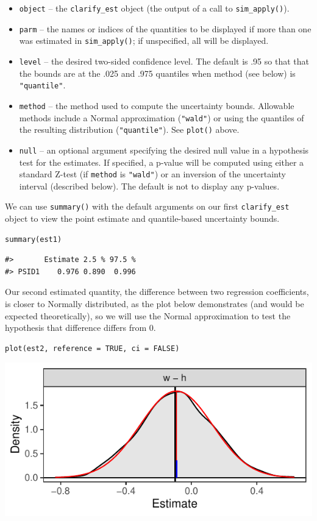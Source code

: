 \begin{itemize}
\item
  \texttt{object} -- the \texttt{clarify\_est} object (the output of a call to \texttt{sim\_apply()}).
\item
  \texttt{parm} -- the names or indices of the quantities to be displayed if more than one was estimated in \texttt{sim\_apply()}; if unspecified, all will be displayed.
\item
  \texttt{level} -- the desired two-sided confidence level. The default is .95 so that that the bounds are at the .025 and .975 quantiles when method (see below) is \texttt{"quantile"}.
\item
  \texttt{method} -- the method used to compute the uncertainty bounds. Allowable methods include a Normal approximation (\texttt{"wald"}) or using the quantiles of the resulting distribution (\texttt{"quantile"}). See \texttt{plot()} above.
\item
  \texttt{null} -- an optional argument specifying the desired null value in a hypothesis test for the estimates. If specified, a p-value will be computed using either a standard Z-test (if \texttt{method} is \texttt{"wald"}) or an inversion of the uncertainty interval (described below). The default is not to display any p-values.
\end{itemize}

We can use \texttt{summary()} with the default arguments on our first \texttt{clarify\_est} object to view the point estimate and quantile-based uncertainty bounds.

\begin{verbatim}
summary(est1)
\end{verbatim}

\begin{verbatim}
#>       Estimate 2.5 % 97.5 %
#> PSID1    0.976 0.890  0.996
\end{verbatim}

Our second estimated quantity, the difference between two regression coefficients, is closer to Normally distributed, as the plot below demonstrates (and would be expected theoretically), so we will use the Normal approximation to test the hypothesis that difference differs from 0.

\begin{verbatim}
plot(est2, reference = TRUE, ci = FALSE)
\end{verbatim}

\begin{center}\includegraphics{figures/plot2-1} \end{center}

